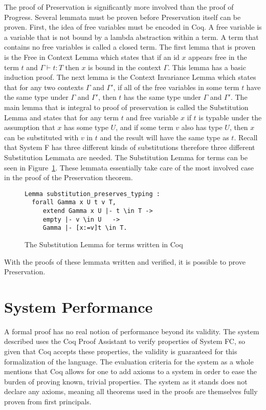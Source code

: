 \documentclass{sig-alternate}
\begin{document}
The proof of Preservation is significantly more involved than the proof of Progress. Several lemmata must be proven before Preservation itself can be proven. First, the idea of free variables must be encoded in Coq. A free variable is a variable that is not bound by a lambda abstraction within a term. A term that contains no free variables is called a closed term. The first lemma that is proven is the Free in Context Lemma which states that if an id $x$ appears free in the term $t$ and $\Gamma \vdash t: T$ then $x$ is bound in the context $\Gamma$. This lemma has a basic induction proof. The next lemma is the Context Invariance Lemma which states that for any two contexts $\Gamma$ and $\Gamma'$, if all of the free variables in some term $t$ have the same type under $\Gamma$ and $\Gamma'$, then $t$ has the same type under $\Gamma$ and $\Gamma'$. The main lemma that is integral to proof of preservation is called the Substitution Lemma and states that for any term $t$ and free variable $x$ if $t$ is typable under the assumption that $x$ has some type $U$, and if some term $v$ also has type $U$, then $x$ can be substituted with $v$ in $t$ and the result will have the same type as $t$. Recall that System F has three different kinds of substitutions therefore three different Substitution Lemmata are needed. The Substitution Lemma for terms can be seen in Figure~\ref{fig:substitution-lemma-coq}. These lemmata essentially take care of the most involved case in the proof of the Preservation theorem.

\begin{figure}[h!]
\begin{verbatim}
Lemma substitution_preserves_typing : 
  forall Gamma x U t v T,
     extend Gamma x U |- t \in T ->
     empty |- v \in U   ->
     Gamma |- [x:=v]t \in T.
\end{verbatim}
\caption{The Substitution Lemma for terms written in Coq}
\label{fig:substitution-lemma-coq}
\end{figure}

With the proofs of these lemmata written and verified, it is possible to prove Preservation.


\section{System Performance}
\label{sec:performance}
A formal proof has no real notion of performance beyond its validity. The system described uses the Coq Proof Assistant to verify properties of System FC, so given that Coq accepts these properties, the validity is guaranteed for this formalization of the language. The evaluation criteria for the system as a whole mentions that Coq allows for one to add axioms to a system in order to ease the burden of proving known, trivial properties. The system as it stands does not declare any axioms, meaning all theorems used in the proofs are themselves fully proven from first principals.
\end{document}
